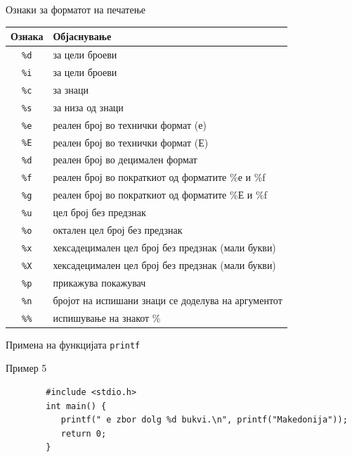 \begin{frame}{Ознаки за форматот на печатење}
\begin{scriptsize}
\begin{tabular}{|c|l|}
\hline \textbf{Ознака} & \textbf{Објаснување} \\ 
\hline \texttt{\%d} & за цели броеви \\ 
\hline \texttt{\%i} & за цели броеви \\ 
\hline \texttt{\%c} & за знаци \\ 
\hline \texttt{\%s} & за низа од знаци \\ 
\hline \texttt{\%e} & реален број во технички формат (е) \\ 
\hline \texttt{\%E} & реален број во технички формат (Е) \\ 
\hline \texttt{\%d} & реален број во децимален формат \\ 
\hline \texttt{\%f} & реален број во пократкиот од форматите \%е и \%f \\ 
\hline \texttt{\%g} & реален број во пократкиот од форматите \%Е и \%f \\  
\hline \texttt{\%u} & цел број без предзнак \\ 
\hline \texttt{\%o} & октален цел број без предзнак \\ 
\hline \texttt{\%x} & хексадецимален цел број без предзнак (мали букви) \\ 
\hline \texttt{\%X} & хексадецимален цел број без предзнак (мали букви) \\ 
\hline \texttt{\%p} & прикажува покажувач \\ 
\hline \texttt{\%n} & бројот на испишани знаци се доделува на аргументот \\ 
\hline \texttt{\%\%} & испишување на знакот \% \\ 
\hline 
\end{tabular} 
\end{scriptsize}
\end{frame}

\begin{frame}[fragile]{Примена на функцијата \texttt{printf}}
	\begin{exampleblock}{Пример 5}
		\begin{lstlisting}
		#include <stdio.h>
		int main() {
		   printf(" e zbor dolg %d bukvi.\n", printf("Makedonija"));
		   return 0;
		}
		\end{lstlisting}
	\end{exampleblock}
\end{frame}

